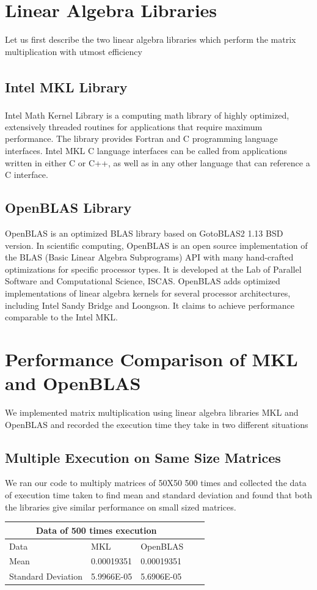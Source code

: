 \documentclass{article}
\begin{document}
\section*{Linear Algebra Libraries}
Let us first describe the two linear algebra libraries which perform the matrix multiplication with utmost efficiency
\subsection*{Intel\textsuperscript{\textregistered} MKL Library}
Intel\textsuperscript{\textregistered} Math Kernel Library \cite{mkl} is a computing math library of highly optimized, extensively threaded routines for applications that require maximum performance. The library provides Fortran and C programming language interfaces. Intel MKL C language interfaces can be called from applications written in either C or C++, as well as in any other language that can reference a C interface.

\subsection*{OpenBLAS Library}
OpenBLAS \cite{openBLAS} is an optimized BLAS library based on GotoBLAS2 1.13 BSD version. In scientific computing, OpenBLAS is an open source implementation of the BLAS (Basic Linear Algebra Subprograms) API with many hand-crafted optimizations for specific processor types. It is developed at the Lab of Parallel Software and Computational Science, ISCAS. OpenBLAS adds optimized implementations of linear algebra kernels for several processor architectures, including Intel Sandy Bridge and Loongson. It claims to achieve performance comparable to the Intel MKL.

\section*{Performance Comparison of MKL and OpenBLAS}
We implemented matrix multiplication using linear algebra libraries MKL and OpenBLAS and recorded the execution time they take in two different situations
\subsection{Multiple Execution on Same Size Matrices}
We ran our code to multiply matrices of 50X50 500 times and collected the data of execution time taken to find mean and standard deviation and found that both the libraries give similar performance on small sized matrices.\\
\begin{center}
\begin{tabular}[h]{|l|l|l|l|l|}
\hline
\multicolumn{3}{|c|}{Data of 500 times execution} \\
\hline
Data & MKL & OpenBLAS\\
\hline
Mean & 0.00019351 & 0.00019351\\
\hline
Standard Deviation & 5.9966E-05 & 5.6906E-05\\
\hline
\end{tabular}
\end{center}
\end{document}
